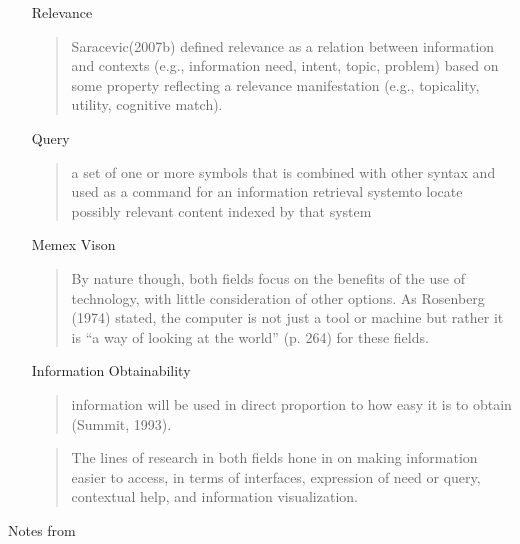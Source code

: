 \documentclass{article}
\begin{document}
\begin{itemize}
    \item[Relevance]
        \begin{quote}
            Saracevic(2007b) defined relevance as a relation between information and contexts (e.g., information need, intent, topic, problem) based on some property reflecting a relevance manifestation (e.g., topicality, utility, cognitive match).
        \end{quote}

    \item[Query]
        \begin{quote}
            a set of one or more symbols that is combined with other syntax and used as a command for an information retrieval systemto locate possibly relevant content indexed by that system
        \end{quote}

    \item[Memex Vison]
        \begin{quote}
             By nature though, both fields focus on the benefits of the use of technology, with little consideration of other options. As Rosenberg (1974) stated, the computer is not just a tool or machine but rather it is “a way of looking at the world” (p. 264) for these fields.
        \end{quote}

    \item[Information Obtainability]
        \begin{quote}
            information will be  used  in  direct  proportion  to  how  easy  it  is  to  obtain (Summit, 1993).
        \end{quote}

        \begin{quote}
            The lines of research in both fields hone in on making information easier to access, in terms of interfaces, expression of need or query, contextual help, and information visualization.
        \end{quote}


\end{itemize}

Notes from \cite{fuhr08}
\end{document}
